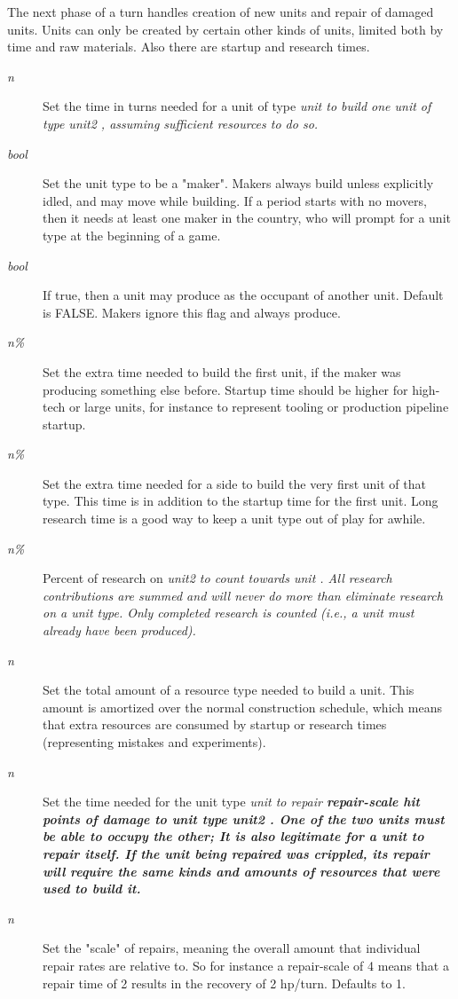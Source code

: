 The next phase of a turn handles creation of new units and repair of damaged
units.
Units can only be created by certain other
kinds of units, limited both by time and raw materials.  Also there are
startup and research times.
\begin{description}
\item[{%
\it n}]
Set the time in turns needed for a unit of type %
\it unit \rm%
to build one unit of type %
\it unit2\rm%
,
assuming sufficient resources to do so.
\item[{%
\it bool}]
Set the unit type to be a "maker".  Makers always build unless
explicitly idled, and may move while building.  If a period starts with
no movers, then it needs at least one maker in the country, who will prompt
for a unit type at the beginning of a game.
\item[{%
\it bool}]
If true, then a unit may produce as the occupant of another unit.
Default is FALSE.  Makers ignore this flag and always produce.
\item[{%
\it n\%}]
Set the extra time needed to build the first unit, if the maker was
producing something else before.  Startup time should be higher for
high-tech or large units, for instance to represent tooling or production
pipeline startup.
\item[{%
\it n\%}]
Set the extra time needed for a side to build the very first unit of
that type.  This time is in addition to the startup time for the first unit.
Long research time is a good way to keep a unit type out of play for awhile.
\item[{%
\it n\%}]
Percent of research on %
\it unit2 \rm%
to count towards %
\it unit\rm%
.  All
research contributions are summed and will never do more than
eliminate research on a unit type.  Only completed research is counted
(i.e., a unit must already have been produced).
\item[{%
\it n}]
Set the total amount of a resource type needed to build a unit.
This amount is amortized over the normal construction schedule, which
means that extra resources are consumed by startup or research times
(representing mistakes and experiments).
\item[{%
\it n}]
Set the time needed for the unit type %
\it unit \rm%
to repair %
\bf repair-scale %
\rm hit points of damage to unit type %
\it unit2\rm%
.
One of the two units must be able to occupy the other;
It is also legitimate for a unit to repair itself.
If the unit being repaired was crippled,
its repair will require the same kinds and amounts of resources that
were used to build it.
\item[{%
\it n}]
Set the "scale" of repairs, meaning the overall amount that individual
repair rates are relative to.  So for instance a repair-scale of 4 means
that a repair time of 2 results in the recovery of 2 hp/turn.  Defaults to 1.
\end{description}\par\noindent
